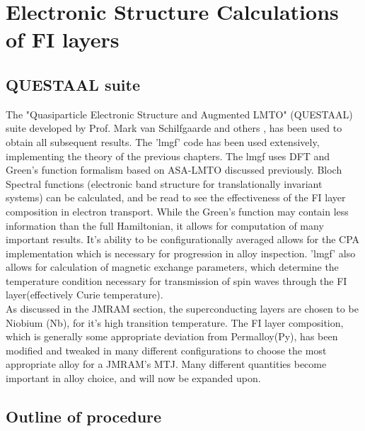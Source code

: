 \documentclass[12pt]{article}
\begin{document}
\section{Electronic Structure Calculations of FI layers}

\subsection{QUESTAAL suite}

The "Quasiparticle Electronic Structure and Augmented LMTO" (QUESTAAL) suite developed by Prof. Mark van Schilfgaarde and others \cite{ques}, has been used to obtain all subsequent results. The 'lmgf' code has been used extensively, implementing the theory of the previous chapters. The lmgf uses DFT and Green’s function formalism based on ASA-LMTO discussed previously. Bloch Spectral functions (electronic band structure for translationally invariant systems) can be calculated, and be read to see the effectiveness of the FI layer composition in electron transport. While the Green's function may contain less information than the full Hamiltonian, it allows for computation of many important results. It's ability to be configurationally averaged allows for the CPA implementation which is necessary for progression in alloy inspection. 'lmgf' also allows for calculation of magnetic exchange parameters, which determine the temperature condition necessary for transmission of spin waves through the FI layer(effectively Curie temperature). 
\\
As discussed in the JMRAM section, the superconducting layers are chosen to be Niobium (Nb), for it's high transition temperature. The FI layer composition, which is generally some appropriate deviation from Permalloy(Py), has been modified and tweaked in many different configurations to choose the most appropriate alloy for a JMRAM's MTJ. Many different quantities become important in alloy choice, and will now be expanded upon.

\subsection{Outline of procedure}
\end{document}
